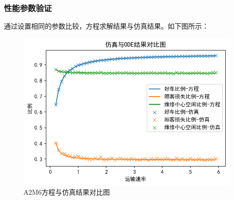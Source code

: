\documentclass{article}
\begin{document}
\subsubsection{性能参数验证}
通过设置相同的参数比较，方程求解结果与仿真结果。如下图所示：
\begin{figure}[H]
    \centering
    \includegraphics[scale=0.5]{A2M6仿真-odeSingle.png}
    \caption{A2M6方程与仿真结果对比图}
    \label{fig:cenmodel}
\end{figure}
\end{document}
